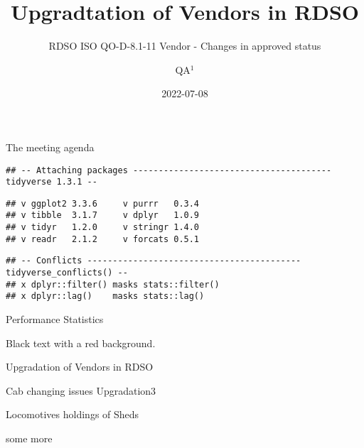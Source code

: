 \documentclass[
  ignorenonframetext,
]{beamer}
\title{Upgradtation of Vendors in RDSO}
\subtitle{RDSO ISO QO-D-8.1-11 Vendor - Changes in approved status}
\author{QA\(^1\)}
\date{2022-07-08}
\institute{\(^1\)QA(Mech)}
\begin{document}
\frame{\titlepage}

\begin{frame}[allowframebreaks]
  \tableofcontents[hideallsubsections]
\end{frame}
\begin{frame}
\end{frame}

\begin{frame}[fragile]{The meeting agenda}
\protect\hypertarget{the-meeting-agenda}{}
\begin{verbatim}
## -- Attaching packages --------------------------------------- tidyverse 1.3.1 --
\end{verbatim}

\begin{verbatim}
## v ggplot2 3.3.6     v purrr   0.3.4
## v tibble  3.1.7     v dplyr   1.0.9
## v tidyr   1.2.0     v stringr 1.4.0
## v readr   2.1.2     v forcats 0.5.1
\end{verbatim}

\begin{verbatim}
## -- Conflicts ------------------------------------------ tidyverse_conflicts() --
## x dplyr::filter() masks stats::filter()
## x dplyr::lag()    masks stats::lag()
\end{verbatim}
\end{frame}

\begin{frame}{Performance Statistics}
\protect\hypertarget{performance-statistics}{}
\begin{shaded}
Black text with a red background.
\end{shaded}


\begin{block}{Upgradation of Vendors in RDSO}
\protect\hypertarget{upgradation-of-vendors-in-rdso}{}
\begin{block}{Cab changing issues}
\protect\hypertarget{cab-changing-issues}{}
Upgradation3
\end{block}
\end{block}
\end{frame}

\begin{frame}{Locomotives holdings of Sheds}
\protect\hypertarget{locomotives-holdings-of-sheds}{}
\end{frame}

\begin{frame}{some more}
\protect\hypertarget{some-more}{}
\end{frame}
\end{document}
